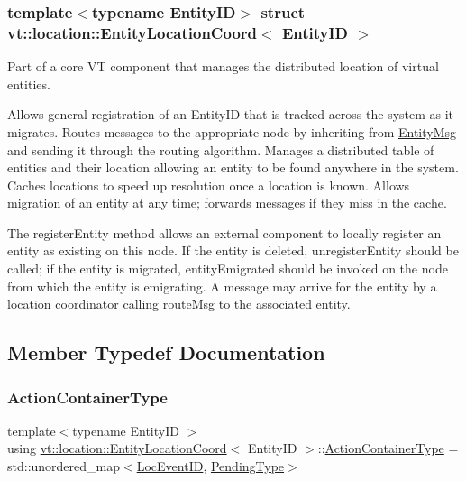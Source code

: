 \subsubsection*{template$<$typename Entity\+ID$>$\newline
struct vt\+::location\+::\+Entity\+Location\+Coord$<$ Entity\+I\+D $>$}

Part of a core VT component that manages the distributed location of virtual entities. 

Allows general registration of an {\ttfamily Entity\+ID} that is tracked across the system as it migrates. Routes messages to the appropriate node by inheriting from {\ttfamily \hyperlink{structvt_1_1location_1_1_entity_msg}{Entity\+Msg}} and sending it through the routing algorithm. Manages a distributed table of entities and their location allowing an entity to be found anywhere in the system. Caches locations to speed up resolution once a location is known. Allows migration of an entity at any time; forwards messages if they miss in the cache.

The {\ttfamily register\+Entity} method allows an external component to locally register an entity as existing on this node. If the entity is deleted, {\ttfamily unregister\+Entity} should be called; if the entity is migrated, {\ttfamily entity\+Emigrated} should be invoked on the node from which the entity is emigrating. A message may arrive for the entity by a location coordinator calling {\ttfamily route\+Msg} to the associated entity. 

\subsection{Member Typedef Documentation}
\mbox{\label{structvt_1_1location_1_1_entity_location_coord_afeaaebfc1d7cbdd20cccbd348d96748a}} 
\subsubsection{\texorpdfstring{Action\+Container\+Type}{ActionContainerType}}
{\footnotesize\ttfamily template$<$typename Entity\+ID $>$ \\
using \hyperlink{structvt_1_1location_1_1_entity_location_coord}{vt\+::location\+::\+Entity\+Location\+Coord}$<$ Entity\+ID $>$\+::\hyperlink{structvt_1_1location_1_1_entity_location_coord_afeaaebfc1d7cbdd20cccbd348d96748a}{Action\+Container\+Type} =  std\+::unordered\+\_\+map$<$\hyperlink{namespacevt_1_1location_aa5ccc1a42aa22b0b41fcfbbdee314dca}{Loc\+Event\+ID}, \hyperlink{structvt_1_1location_1_1_entity_location_coord_a41b5c3792967e089c7e592b705c266c3}{Pending\+Type}$>$}


